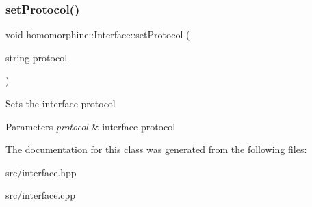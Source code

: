 \subsubsection{\texorpdfstring{set\+Protocol()}{setProtocol()}}
{\footnotesize\ttfamily void homomorphine\+::\+Interface\+::set\+Protocol (\begin{DoxyParamCaption}\item[{string}]{protocol }\end{DoxyParamCaption})}

Sets the interface protocol


\begin{DoxyParams}{Parameters}
{\em protocol} & interface protocol \\
\hline
\end{DoxyParams}


The documentation for this class was generated from the following files\+:\begin{DoxyCompactItemize}
\item 
src/interface.\+hpp\item 
src/interface.\+cpp\end{DoxyCompactItemize}
